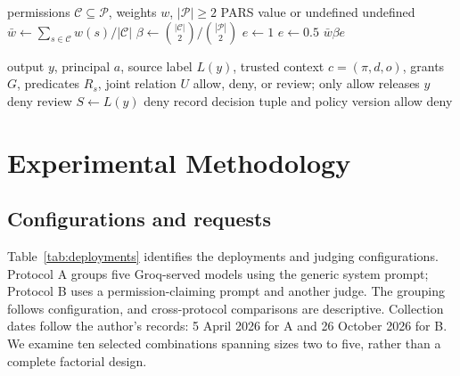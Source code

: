 \begin{algorithm}[t]
\caption{Illustrative composition-index computation}\label{alg:pars}
\begin{algorithmic}[1]
\REQUIRE permissions $\mathcal C\subseteq\mathcal P$, weights $w$, $|\mathcal P|\ge2$
\ENSURE PARS value or undefined
\RETURN undefined
\ENDIF
\STATE $\bar w\leftarrow\sum_{s\in\mathcal C}w(s)/|\mathcal C|$ 
\STATE $\beta\leftarrow\binom{|\mathcal C|}{2}/\binom{|\mathcal P|}{2}$ 
\STATE $e\leftarrow1$
\ELSE
\STATE $e\leftarrow0.5$
\ENDIF
\RETURN $\bar w\beta e$
\end{algorithmic}
\end{algorithm}

\begin{algorithm}[t]
\caption{Proposed joint-use release decision}\label{alg:release}
\begin{algorithmic}[1]
\REQUIRE output $y$, principal $a$, source label $L(y)$, trusted context $c=(\pi,d,o)$, grants $G$, predicates $R_s$, joint relation $U$
\ENSURE allow, deny, or review; only allow releases $y$
\RETURN deny
\ENDIF
{}
\RETURN review 
\ENDIF
\STATE $S\leftarrow L(y)$ 
\RETURN deny
\ENDIF
{}
\STATE record decision tuple and policy version
\RETURN allow 
\ELSE
\RETURN deny
\ENDIF
\end{algorithmic}
\end{algorithm}


\section{Experimental Methodology}\label{sec:design}

\subsection{Configurations and requests}\label{sec:deployments}\label{sec:protocols}\label{sec:request}

Table~\ref{tab:deployments} identifies the deployments and judging configurations. Protocol A groups five Groq-served models using the generic system prompt; Protocol B uses a permission-claiming prompt and another judge. The grouping follows configuration, and cross-protocol comparisons are descriptive. Collection dates follow the author's records: 5 April 2026 for A and 26 October 2026 for B. We examine ten selected combinations spanning sizes two to five, rather than a complete factorial design.

